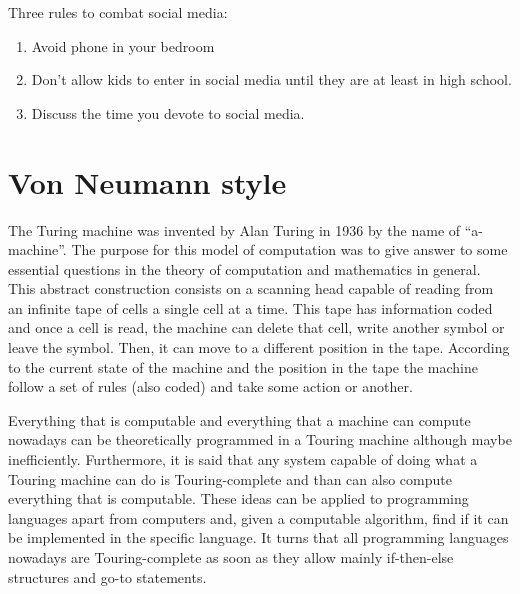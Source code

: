   
%  
%  
%  
% 

  
   
Three rules to combat social media:
\begin{enumerate} 
\item Avoid phone in your bedroom
\item Don't allow kids to enter in social media until they are at least in high school. 
\item Discuss the time you devote to social media. 
\end{enumerate} 

 
\newpage   
    \section{Von Neumann style} 
\vspace{-0.3cm}
The Turing machine was invented by Alan Turing in 1936 by the name of ``a-machine''. 
The purpose for this model of computation was to give answer to some essential questions 
in the theory of computation and mathematics in general. 
This abstract construction consists on a scanning head capable of reading from an 
infinite tape of cells a single cell at a time. 
This tape has information coded and once a cell is read, the machine can delete that cell, 
write another symbol or leave the symbol. 
Then, it can move to a different position in the tape. 
According to the current state of the 
machine and the position in the tape the machine follow a set of rules (also coded) and take some action or another. 

Everything that is computable and everything that a machine can compute nowadays can be theoretically programmed in a Touring machine 
although maybe inefficiently. 
Furthermore, it is said that any system capable of doing what a Touring machine can do is Touring-complete and 
than can also compute everything that is computable. 
These ideas can be applied to programming languages apart from computers and,
given a computable algorithm, find if it can be implemented in the specific language.
It turns that all programming languages nowadays are Touring-complete as soon as they allow 
mainly if-then-else structures and go-to statements. 


